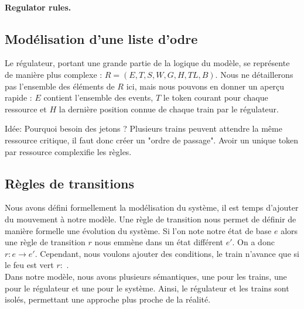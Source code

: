 \documentclass[runningheads]{llncs}
\begin{document}
\paragraph{Regulator rules.}

\subsection{Modélisation d'une liste d'odre}
Le régulateur, portant une grande partie de la logique du modèle, se représente de manière plus complexe : $R = (E,T,S,W,G,H,TL,B)$.
Nous ne détaillerons pas l'ensemble des éléments de $R$ ici, mais nous pouvons en donner un aperçu rapide : $E$ contient l'ensemble des events,
$T$ le token courant pour chaque ressource et $H$ la dernière position connue de chaque train par le régulateur.

Idée: Pourquoi besoin des jetons ? Plusieurs trains peuvent attendre la même ressource critique, il faut donc créer un "ordre de passage".
Avoir un unique token par ressource complexifie les règles.


\subsection{Règles de transitions}
Nous avons défini formellement la modélisation du système, il est temps d'ajouter du mouvement à notre modèle.
Une règle de transition nous permet de définir de manière formelle une évolution du système. 
Si l'on note notre état de base $e$ alors une règle de transition $r$ nous emmène dans un état différent $e'$. On a donc $r: e \rightarrow e'$.
Cependant, nous voulons ajouter des conditions, le train n'avance que si le feu est vert $r:$ .
\\Dans notre modèle, nous avons plusieurs sémantiques, une pour les trains, une pour le régulateur et une pour le système.
Ainsi, le régulateur et les trains sont isolés, permettant une approche plus proche de la réalité.\\
\end{document}
